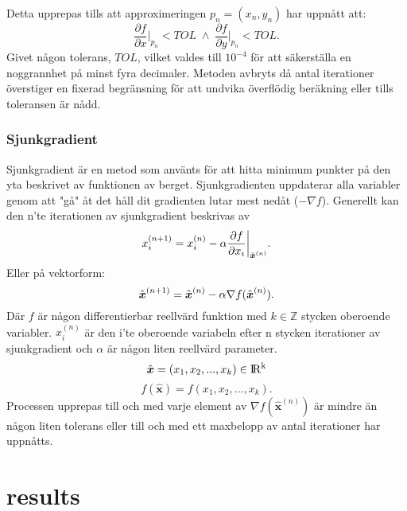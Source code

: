 Detta upprepas tills att approximeringen $p_n = (x_n,y_n)$ har uppnått att: 
\begin{equation*}
    \frac{\partial f}{\partial x}\biggr\rvert_{p_n}<TOL  \;\wedge\;  \frac{\partial f}{\partial y}\biggr\rvert_{p_n}<TOL.
\end{equation*}
Givet någon tolerans, $TOL$, vilket valdes till $10^{-4}$ för att säkerställa en noggrannhet på minst fyra decimaler. Metoden avbryts då antal iterationer överstiger en fixerad begränsning för att undvika överflödig beräkning eller tills toleransen är nådd.
\subsubsection{Sjunkgradient}
Sjunkgradient är en metod som använts för att hitta minimum punkter på den yta beskrivet av funktionen av berget. Sjunkgradienten uppdaterar alla variabler genom att "gå" åt det håll dit gradienten lutar mest nedåt ($-\nabla f$). Generellt kan den n'te iterationen av sjunkgradient beskrivas av
\begin{equation}
    x_i^{(n+1)}=x_i^{(n)}-\alpha\frac{\partial f}{\partial x_i}\biggr\rvert_{\hat{\boldsymbol{x}}^{(n)}}.\\
\end{equation}
Eller på vektorform:
\begin{equation}
    \hat{\boldsymbol{x}}^{(n+1)}=\hat{\boldsymbol{x}}^{(n)}-\alpha\nabla f(\hat{\boldsymbol{x}}^{(n)}).\\
\end{equation}
Där $f$ är någon differentierbar reellvärd funktion med $k\in \mathbb{Z}$ stycken oberoende variabler. $x_i^{(n)}$ är den i'te oberoende variabeln efter n stycken iterationer av sjunkgradient och $\alpha$ är någon liten reellvärd parameter.
\begin{equation*}
    \hat{\boldsymbol{x}}=(x_1,x_2,...,x_k)\in{\rm I\!R^k}\\
\end{equation*}
\begin{equation*}
    f(\hat{\boldsymbol{x}}) = f(x_1,x_2,...,x_k).
\end{equation*}
Processen upprepas till och med varje element av $\nabla f(\hat{\boldsymbol{x}}^{(n)})$ är mindre än någon liten tolerans eller till och med ett maxbelopp av antal iterationer har uppnåtts.

\section{results}

